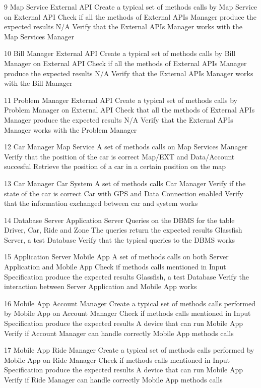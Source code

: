 \testCase
	{9}
	{Map Service}
	{External API}
	{Create a typical set of methods calls by Map Service on External API}
	{Check if all the methods of External  APIs Manager produce the expected results}
	{N/A}
	{Verify that the External APIs Manager works  with the Map Services Manager}
	
\testCase
	{10}
	{Bill Manager}
	{External API}
	{Create a typical set of methods calls by Bill Manager on External API}
	{Check if all the methods of External   APIs Manager produce the expected results}
	{N/A}
	{Verify that the External APIs Manager works  with the Bill Manager}

\testCase
	{11}
	{Problem Manager}
	{External API}
	{Create a typical set of methods calls by Problem Manager on External API}
	{Check that all the methods of External   APIs Manager produce the expected results}
	{N/A}
	{Verify that the External APIs Manager works  with the Problem Manager}

\testCase
	{12}
	{Car Manager}
	{Map Service}
	{A set of methods calls on Map Services Manager}
	{Verify that the position of the car is correct}
	{Map/EXT and Data/Account succesful}
	{Retrieve the position of a car in a certain position on the map}

\testCase
	{13}
	{Car Manager}
	{Car System}
	{A set of methods calls Car Manager}
	{Verify if the state of the car is correct}
	{Car with GPS and Data Connection enabled}
	{Verify that the information exchanged between car and system works}

\testCase
	{14}
	{Database Server}
	{Application Server}
	{Queries on the DBMS for the table Driver, Car, Ride and Zone}
	{The queries return the expected results}
	{Glassfish Server, a test Database}
	{Verify that the typical queries to the DBMS  works}

\testCase
	{15}
	{Application Server}
	{Mobile App}
	{A set of methods calls on both Server Application and Mobile App }
	{Check if methods calls mentioned in Input Specification produce the expected results}
	{Glassfish, a test Database}
	{Verify the interaction between Server Application and Mobile App works}

\testCase
	{16}
	{Mobile App}
	{Account Manager}
	{Create a typical set of methods calls performed by Mobile App on Account Manager}
	{Check if methods calls mentioned in Input Specification produce the expected results}
	{A device that can run Mobile App}
	{Verify  if Account Manager can handle correctly Mobile App methods calls}
	
\testCase
	{17}
	{Mobile App}
	{Ride Manager}
	{Create a typical set of methods calls performed by Mobile App on Ride Manager}
	{Check if methods calls mentioned in Input Specification produce the expected results}
	{A device that can run Mobile App}
	{Verify  if Ride Manager can handle correctly Mobile App methods calls}

